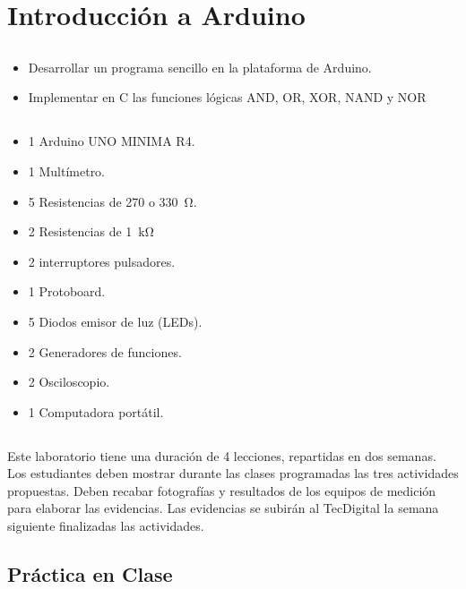 \chapter{Introducción a Arduino}
\section{\obj}
\capacidad
\begin{itemize}
    \item Desarrollar un programa sencillo en la plataforma de Arduino.
    \item Implementar en C las funciones lógicas AND, OR, XOR, NAND y NOR
\end{itemize}

\section{\mat}
\begin{itemize}
\item 1 Arduino UNO MINIMA R4.
\item 1 Multímetro.
\item 5 Resistencias de 270 o \SI{330}{\ohm}.
\item 2 Resistencias de \SI{1}{\kilo\ohm}
\item 2 interruptores pulsadores.
\item 1 Protoboard.
\item 5 Diodos emisor de luz (LEDs).
\item 2 Generadores de funciones.
\item 2 Osciloscopio.
\item 1 Computadora portátil.
\end{itemize}

\section{\pro}

Este laboratorio tiene una duración de 4 lecciones, repartidas en dos semanas. Los estudiantes deben mostrar durante las clases programadas las tres actividades propuestas. Deben recabar fotografías y resultados de los equipos de medición para elaborar las evidencias. Las evidencias se subirán al TecDigital la semana siguiente finalizadas las actividades.

\section{Práctica en Clase}

